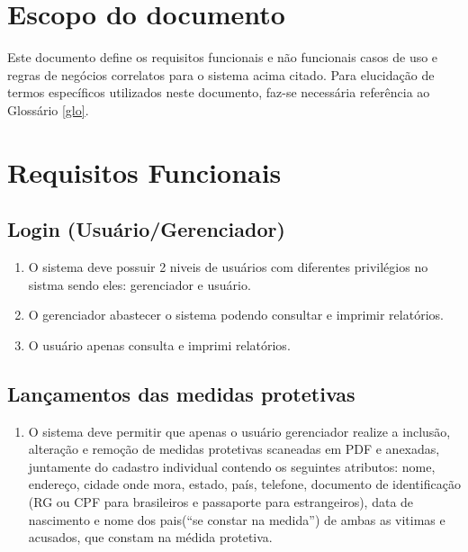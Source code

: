 \documentclass[
	12pt,				%
    oneside,			%
	a4paper,			%
	english,			%
	french,				%
	spanish,			%
	brazil,				%
	]{abntex2}
\begin{document}
	\section{Escopo do documento}
	
		Este documento define os requisitos funcionais e não funcionais casos de uso e regras de negócios correlatos para o sistema acima citado. Para elucidação de termos específicos utilizados neste documento, faz-se necessária referência ao Glossário \ref{glo}.

	\section {Requisitos Funcionais}\label{RF}
	
		\subsection{Login (Usuário/Gerenciador)}\label{RF1}
			\begin{enumerate}
				\item O sistema deve possuir 2 niveis de usuários com diferentes privilégios no sistma sendo eles: gerenciador e usuário.\label{login1}
				 \item O gerenciador abastecer o sistema podendo consultar e imprimir relatórios.
				 \item O usuário apenas consulta e imprimi relatórios.
			
			\end{enumerate}
		 
		\subsection{Lançamentos das medidas protetivas}\label{RF2} 
	    	\begin{enumerate} 
				\item O sistema deve permitir que apenas o usuário gerenciador realize a inclusão, alteração e remoção de medidas protetivas scaneadas em PDF e anexadas, juntamente do cadastro individual contendo os seguintes atributos: nome, endereço, cidade onde mora, estado, país, telefone, documento de identificação (RG ou CPF para brasileiros e passaporte para estrangeiros), data de nascimento e nome dos pais(“se constar na medida”) de ambas as vitimas e acusados, que constam na médida protetiva.\label{teste}
			
		   	\end{enumerate}
   	
\end{document}
